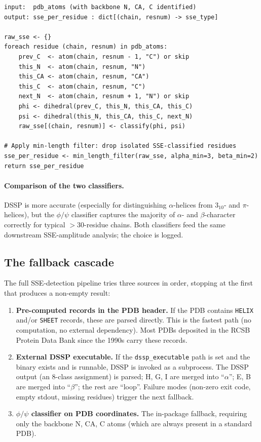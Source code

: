 \documentclass[10pt,a4paper,twoside]{article}
\newcommand{\fn}[1]{\texttt{#1}}
\newcommand{\cfgkey}[1]{\texttt{#1}}
\begin{document}
\begin{lstlisting}[style=pseudo,
  caption={$\phi/\psi$ secondary-structure classifier.
           Implementation: \protect\fn{geometry.detect\_sse\_phipsi}.}]
input:  pdb_atoms (with backbone N, CA, C identified)
output: sse_per_residue : dict[(chain, resnum) -> sse_type]

raw_sse <- {}
foreach residue (chain, resnum) in pdb_atoms:
    prev_C  <- atom(chain, resnum - 1, "C") or skip
    this_N  <- atom(chain, resnum, "N")
    this_CA <- atom(chain, resnum, "CA")
    this_C  <- atom(chain, resnum, "C")
    next_N  <- atom(chain, resnum + 1, "N") or skip
    phi <- dihedral(prev_C, this_N, this_CA, this_C)
    psi <- dihedral(this_N, this_CA, this_C, next_N)
    raw_sse[(chain, resnum)] <- classify(phi, psi)

# Apply min-length filter: drop isolated SSE-classified residues
sse_per_residue <- min_length_filter(raw_sse, alpha_min=3, beta_min=2)
return sse_per_residue
\end{lstlisting}

\paragraph{Comparison of the two classifiers.}
DSSP is more accurate (especially for distinguishing $\alpha$-helices
from 3$_{10}$- and $\pi$-helices), but the $\phi/\psi$ classifier
captures the majority of $\alpha$- and $\beta$-character correctly
for typical $> 30$-residue chains. Both classifiers feed the same
downstream SSE-amplitude analysis; the choice is logged.

\subsection{The fallback cascade}

The full SSE-detection pipeline tries three sources in order, stopping
at the first that produces a non-empty result:

\begin{enumerate}
  \item \textbf{Pre-computed records in the PDB header.} If the PDB
        contains \texttt{HELIX} and/or \texttt{SHEET} records, these
        are parsed directly. This is the fastest path (no
        computation, no external dependency). Most PDBs deposited
        in the RCSB Protein Data Bank since the 1990s carry these
        records.
  \item \textbf{External DSSP executable.} If the
        \cfgkey{dssp\_executable} path is set and the binary exists
        and is runnable, DSSP is invoked as a subprocess. The DSSP
        output (an 8-class assignment) is parsed; H, G, I are
        merged into ``$\alpha$''; E, B are merged into ``$\beta$'';
        the rest are ``loop''. Failure modes (non-zero exit code,
        empty stdout, missing residues) trigger the next fallback.
  \item \textbf{$\phi/\psi$ classifier on PDB coordinates.} The
        in-package fallback, requiring only the backbone N, CA, C
        atoms (which are always present in a standard PDB).
\end{enumerate}
\end{document}
